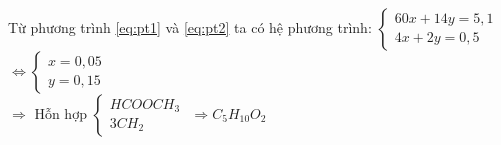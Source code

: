 \begin{vdex}
{\begin{itemize}
\begin{align}
			\end{align}
			Từ phương trình \ref{eq:pt1} và \ref{eq:pt2} ta có hệ phương trình:
			$\begin{cases}
				60x+14y=5,1\\
				4x+2y=0,5
			\end{cases}  $ $ \Leftrightarrow \begin{cases}
				x=0,05\\
				y=0,15
			\end{cases}  $ \\$ \Rightarrow  $ Hỗn hợp 
			$  \begin{cases}
				HCOOCH_3\\
				3CH_2
			\end{cases}  $ $ \Rightarrow C_5H_{10}O_2 $
			
		\end{itemize}
	}
\end{vdex}

